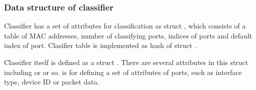\documentclass[a4paper,11pt,openany,oneside,english]{sphinxmanual}
\begin{document}
\subsubsection{Data structure of classifier}
\label{\detokenize{design/impl/spp_vf:data-structure-of-classifier}}
Classifier has a set of attributes for classification as
struct , which consists of a table of MAC addresses,
number of classifying ports, indices of ports
and default index of port.
Clasifier table is implemented as hash of struct .

\begin{sphinxVerbatim}[commandchars=\\\{\},formatcom=\footnotesize]

  
        
       
     \PYG{p}{[}\PYG{p}{]}  
       
\end{sphinxVerbatim}

Classifier itself is defined as a struct .
There are several attributes in this struct including 
or  or so.
 is for defining a set of attributes of ports, such as
interface type, device ID or packet data.
\end{document}
